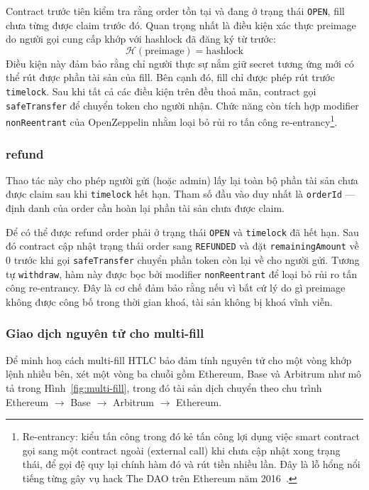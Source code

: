 Contract trước tiên kiểm tra rằng order tồn tại và đang ở trạng thái \texttt{OPEN},
fill chưa từng được claim trước đó. Quan trọng nhất là điều kiện xác thực preimage
do người gọi cung cấp khớp với hashlock đã đăng ký từ trước:
\begin{equation}
    \mathcal{H}(\text{preimage}) = \text{hashlock}
    \label{eq:hashlock-check}
\end{equation}
Điều kiện này đảm bảo rằng chỉ người thực sự nắm giữ secret tương ứng mới có thể rút
được phần tài sản của fill. Bên cạnh đó, fill chỉ được phép rút trước \texttt{timelock}.
Sau khi tất cả các điều kiện trên đều thoả mãn, contract gọi \texttt{safeTransfer}
để chuyển token cho người nhận. Chức năng còn tích hợp modifier \texttt{nonReentrant} của OpenZeppelin nhằm loại bỏ rủi ro tấn công re-entrancy\footnote{Re-entrancy: kiểu tấn công trong đó kẻ tấn công lợi dụng việc smart contract gọi sang một contract ngoài (external call) khi chưa cập nhật xong trạng thái, để gọi đệ quy lại chính hàm đó và rút tiền nhiều lần. Đây là lỗ hổng nổi tiếng từng gây vụ hack The DAO trên Ethereum năm 2016~\cite{dao_hack_chainlink}.}.

\subsubsection*{refund}

Thao tác này cho phép người gửi (hoặc admin) lấy lại toàn bộ phần tài sản chưa được claim
sau khi \texttt{timelock} hết hạn. Tham số đầu vào duy nhất là \texttt{orderId} --- định danh
của order cần hoàn lại phần tài sản chưa được claim.

Để có thể được refund order phải ở trạng thái \texttt{OPEN} và
\texttt{timelock} đã hết hạn. Sau đó contract cập nhật trạng
thái order sang \texttt{REFUNDED} và đặt \texttt{remainingAmount} về 0 trước khi gọi
\texttt{safeTransfer} chuyển phần token còn lại về cho người gửi. Tương tự
\texttt{withdraw}, hàm này được bọc bởi modifier \texttt{nonReentrant} để loại bỏ rủi ro
tấn công re-entrancy. Đây là cơ chế đảm bảo rằng nếu vì bất cứ lý do gì
 preimage không được công bố trong thời gian khoá, tài sản không bị
khoá vĩnh viễn.

\subsubsection{Giao dịch nguyên tử cho multi-fill}

Để minh hoạ cách multi-fill HTLC bảo đảm tính nguyên tử cho một vòng khớp lệnh nhiều bên,
xét một vòng ba chuỗi gồm Ethereum, Base và Arbitrum như mô tả trong
Hình~\ref{fig:multi-fill}, trong đó tài sản dịch chuyển theo chu trình
Ethereum $\to$ Base $\to$ Arbitrum $\to$ Ethereum.

